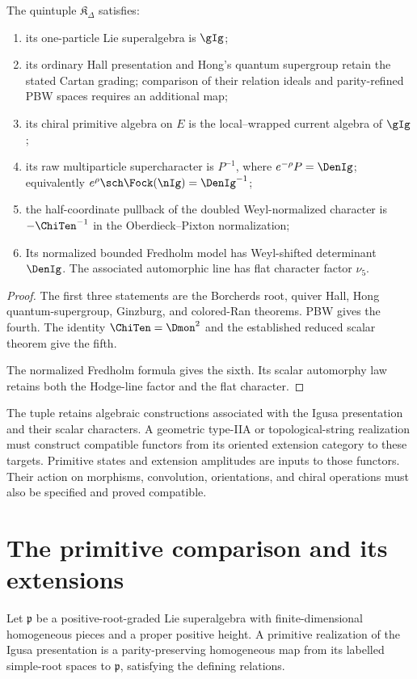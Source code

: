 \begin{theorem}

The quintuple $\mathfrak K_\Delta$ satisfies:
\begin{enumerate}
\item its one-particle Lie superalgebra is $\gIg$;
\item its ordinary Hall presentation and Hong's quantum supergroup retain
the stated Cartan grading; comparison of their relation ideals and
parity-refined PBW spaces requires an additional map;
\item its chiral primitive algebra on $E$ is the local--wrapped current algebra of $\gIg$;
\item its raw multiparticle supercharacter is $P^{-1}$, where $e^{-\rho}P=\DenIg$; equivalently $e^{\rho}\sch\Fock(\nIg)=\DenIg^{-1}$;
\item the half-coordinate pullback of the doubled Weyl-normalized character is $-\ChiTen^{-1}$ in the Oberdieck--Pixton normalization;

\item Its normalized bounded Fredholm model has Weyl-shifted determinant $\DenIg$.
The associated automorphic line has flat character factor $\nu_5$.
\end{enumerate}
\end{theorem}
\begin{proof}
The first three statements are the Borcherds root, quiver Hall, Hong quantum-supergroup, Ginzburg, and colored-Ran theorems.  PBW gives the fourth.  The identity $\ChiTen=\Dmon^2$ and the established reduced scalar theorem give the fifth.

The normalized Fredholm formula gives the sixth. Its scalar automorphy law retains both the Hodge-line factor and the flat character.
\end{proof}

The tuple retains algebraic constructions associated with the Igusa
presentation and their scalar characters. A geometric type-IIA or
topological-string realization must construct compatible functors
from its oriented extension category to these targets. Primitive
states and extension amplitudes are inputs to those functors.
Their action on morphisms, convolution, orientations, and chiral
operations must also be specified and proved compatible.

\chapter{The primitive comparison and its extensions}
Let \(\mathfrak p\) be a positive-root-graded Lie superalgebra
with finite-dimensional homogeneous pieces and a proper positive
height. A primitive realization of the Igusa presentation is a
parity-preserving homogeneous map from its labelled simple-root
spaces to \(\mathfrak p\), satisfying the defining relations.

